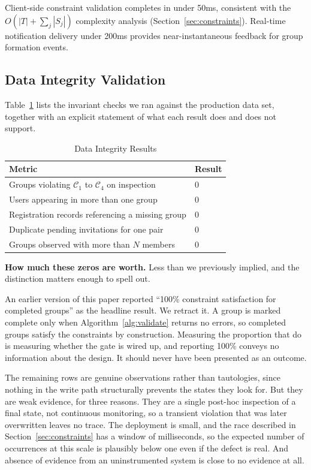 \documentclass[11pt,a4paper]{article}
\theoremstyle{plain}
\theoremstyle{definition}
\theoremstyle{remark}
\begin{document}
Client-side constraint validation completes in under 50ms, consistent with the $O(|T| + \sum_j |S_j|)$ complexity analysis (Section~\ref{sec:constraints}). Real-time notification delivery under 200ms provides near-instantaneous feedback for group formation events.

\subsection{Data Integrity Validation}

Table~\ref{tab:integrity_results} lists the invariant checks we ran against the production data set, together with an explicit statement of what each result does and does not support.

\begin{table}[htbp]
\centering
\caption{Data Integrity Results}
\label{tab:integrity_results}
\small
\renewcommand{\arraystretch}{1.15}
\begin{tabular}{@{}ll@{}}
\toprule
\textbf{Metric} & \textbf{Result} \\
\midrule
Groups violating $\mathcal{C}_1$ to $\mathcal{C}_4$ on inspection & 0 \\
Users appearing in more than one group & 0 \\
Registration records referencing a missing group & 0 \\
Duplicate pending invitations for one pair & 0 \\
Groups observed with more than $N$ members & 0 \\
\bottomrule
\end{tabular}
\end{table}

\textbf{How much these zeros are worth.} Less than we previously implied, and the distinction matters enough to spell out.

An earlier version of this paper reported ``100\% constraint satisfaction for completed groups'' as the headline result. We retract it. A group is marked complete only when Algorithm~\ref{alg:validate} returns no errors, so completed groups satisfy the constraints by construction. Measuring the proportion that do is measuring whether the gate is wired up, and reporting 100\% conveys no information about the design. It should never have been presented as an outcome.

The remaining rows are genuine observations rather than tautologies, since nothing in the write path structurally prevents the states they look for. But they are weak evidence, for three reasons. They are a single post-hoc inspection of a final state, not continuous monitoring, so a transient violation that was later overwritten leaves no trace. The deployment is small, and the race described in Section~\ref{sec:constraints} has a window of milliseconds, so the expected number of occurrences at this scale is plausibly below one even if the defect is real. And absence of evidence from an uninstrumented system is close to no evidence at all.
\end{document}
